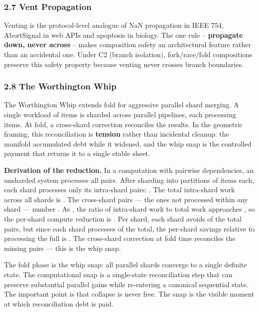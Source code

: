 \documentclass[
]{article}
\begin{document}
\subsubsection{\texorpdfstring{\textbf{2.7 Vent
Propagation}}{2.7 Vent Propagation}}\label{vent-propagation}

Venting is the protocol-level analogue of NaN propagation in IEEE 754,
AbortSignal in web APIs and apoptosis in biology. The one rule --
\textbf{propagate down, never across} -- makes composition safety an
architectural feature rather than an accidental one. Under C2 (branch
isolation), fork/race/fold compositions preserve this safety property
because venting never crosses branch boundaries.

\subsubsection{\texorpdfstring{\textbf{2.8 The Worthington
Whip}}{2.8 The Worthington Whip}}\label{the-worthington-whip}

The Worthington Whip extends fold for aggressive parallel shard merging.
A single workload of items is sharded across parallel pipelines, each
processing items. At fold, a cross-shard correction reconciles the
results. In the geometric framing, this reconciliation is
\textbf{tension} rather than incidental cleanup: the manifold
accumulated debt while it widened, and the whip snap is the controlled
payment that returns it to a single stable sheet.

\textbf{Derivation of the} \textbf{reduction.} In a computation with
pairwise dependencies, an unsharded system processes all pairs. After
sharding into partitions of items each, each shard processes only its
intra-shard pairs: . The total intra-shard work across all shards is .
The cross-shard pairs --- the ones not processed within any shard ---
number . As , the ratio of intra-shard work to total work approaches ,
so the per-shard compute reduction is . Per shard, each shard avoids of
the total pairs, but since each shard processes of the total, the
per-shard savings relative to processing the full is . The cross-shard
correction at fold time reconciles the missing pairs --- this is the
whip snap.

The fold phase is the whip snap: all parallel shards converge to a
single definite state. The computational snap is a single-state
reconciliation step that can preserve substantial parallel gains while
re-entering a canonical sequential state. The important point is that
collapse is never free. The snap is the visible moment at which
reconciliation debt is paid.
\end{document}
